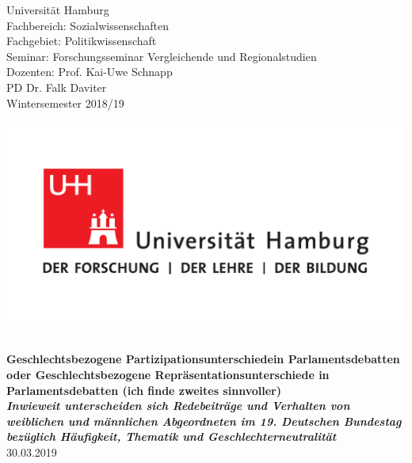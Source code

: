 \documentclass[12pt, 
    twoside=false, 
    bibliography=totoc, 
    numbers=endperiod, 
    headings=normal, 
    toc=chapterentrydotfill
    ]{scrbook}
\begin{document}
\begin{titlepage}
    \begin{minipage}[t]{0.6\textwidth}
    \flushleft 
    Universität Hamburg \\
    Fachbereich: Sozialwissenschaften \\
    Fachgebiet: Politikwissenschaft \\
    Seminar: Forschungsseminar Vergleichende und Regionalstudien \\ 
    Dozenten: Prof. Kai-Uwe Schnapp \\
    PD Dr. Falk Daviter \\
    Wintersemester 2018/19 \\
    \end{minipage}
    \hfill
    \begin{minipage}[t][1.7cm][b]{0.35\textwidth}
    \includegraphics[width=\textwidth]{images/UHH-Logo_2010_Farbe_CMYK.pdf}
    \end{minipage}
    
    \vspace*{\fill}
    \begin{center}
	\vspace{1cm} \vspace{0.2cm} \\
	\textbf{\Large Geschlechtsbezogene Partizipationsunterschiedein Parlamentsdebatten  oder Geschlechtsbezogene Repräsentationsunterschiede in Parlamentsdebatten (ich finde zweites sinnvoller) \\
	\vspace {0,5cm} \small\emph{Inwieweit unterscheiden sich Redebeiträge und Verhalten von weiblichen und männlichen Abgeordneten im 19. Deutschen Bundestag bezüglich Häufigkeit, Thematik und Geschlechterneutralität}} \\
	\vspace{0.5cm}
	30.03.2019
	\end{center}
    \vspace*{\fill}
	

\end{titlepage}
\end{document}
